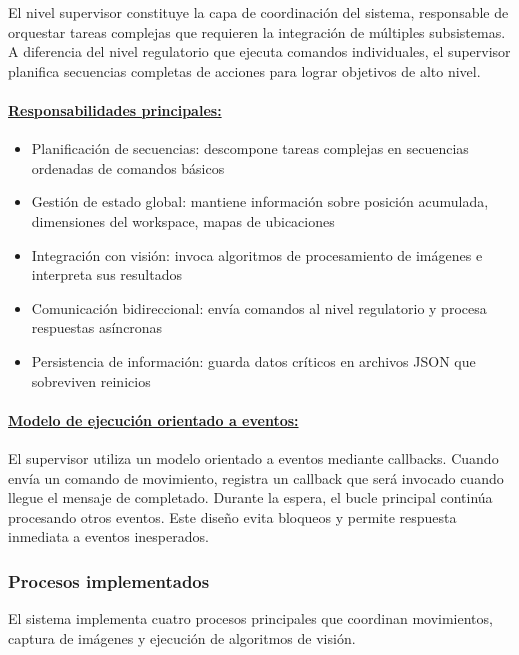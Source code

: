 El nivel supervisor constituye la capa de coordinación del sistema, responsable de orquestar tareas complejas que requieren la integración de múltiples subsistemas. A diferencia del nivel regulatorio que ejecuta comandos individuales, el supervisor planifica secuencias completas de acciones para lograr objetivos de alto nivel.

\paragraph{\underline{Responsabilidades principales:}}

\begin{itemize}[label=$\bullet$]
    \item Planificación de secuencias: descompone tareas complejas en secuencias ordenadas de comandos básicos
    \item Gestión de estado global: mantiene información sobre posición acumulada, dimensiones del workspace, mapas de ubicaciones
    \item Integración con visión: invoca algoritmos de procesamiento de imágenes e interpreta sus resultados
    \item Comunicación bidireccional: envía comandos al nivel regulatorio y procesa respuestas asíncronas
    \item Persistencia de información: guarda datos críticos en archivos JSON que sobreviven reinicios
\end{itemize}

\paragraph{\underline{Modelo de ejecución orientado a eventos:}}

El supervisor utiliza un modelo orientado a eventos mediante callbacks. Cuando envía un comando de movimiento, registra un callback que será invocado cuando llegue el mensaje de completado. Durante la espera, el bucle principal continúa procesando otros eventos. Este diseño evita bloqueos y permite respuesta inmediata a eventos inesperados.

\subsubsection{Procesos implementados}

El sistema implementa cuatro procesos principales que coordinan movimientos, captura de imágenes y ejecución de algoritmos de visión.

